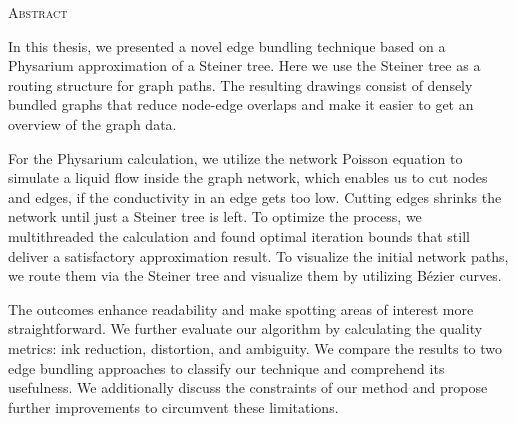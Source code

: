 \begin{center}
  \textsc{Abstract}
\end{center}
\noindent

In this thesis, we presented a novel edge bundling technique based on a Physarium approximation of a Steiner tree. Here we use the Steiner tree as a routing structure for graph paths. The resulting drawings consist of densely bundled graphs that reduce node-edge overlaps and make it easier to get an overview of the graph data.

For the Physarium calculation, we utilize the network Poisson equation to simulate a liquid flow inside the graph network, which enables us to cut nodes and edges, if the conductivity in an edge gets too low. Cutting edges shrinks the network until just a Steiner tree is left. To optimize the process, we multithreaded the calculation and found optimal iteration bounds that still deliver a satisfactory approximation result.
To visualize the initial network paths, we route them via the Steiner tree and visualize them by utilizing B\'{e}zier curves.

The outcomes enhance readability and make spotting areas of interest more straightforward. We further evaluate our algorithm by calculating the quality metrics: ink reduction, distortion, and ambiguity. We compare the results to two edge bundling approaches to classify our technique and comprehend its usefulness. We additionally discuss the constraints of our method and propose further improvements to circumvent these limitations.

\cleardoublepage
